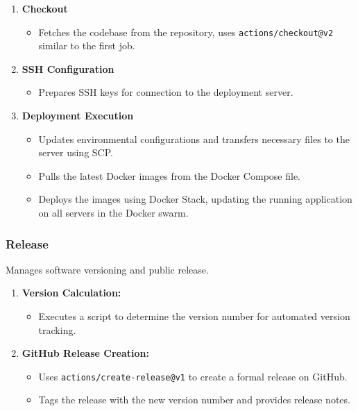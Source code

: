 \documentclass[12pt, a4paper, oneside]{book}
\begin{document}
\begin{enumerate}
    \item \textbf{Checkout} 
    \begin{itemize}
        \item Fetches the codebase from the repository, uses \texttt{actions/checkout@v2} similar to the first job.
    \end{itemize}
    \item \textbf{SSH Configuration} 
    \begin{itemize}
        \item Prepares SSH keys for connection to the deployment server.
    \end{itemize}
    
    \item \textbf{Deployment Execution}
    \begin{itemize}
        \item Updates environmental configurations and transfers necessary files to the server using SCP.
        \item Pulls the latest Docker images from the Docker Compose file.
        \item Deploys the images using Docker Stack, updating the running application on all servers in the Docker swarm.
    \end{itemize}
\end{enumerate}

 \subsubsection{Release}
 Manages software versioning and public release.

 \begin{enumerate}
    \item \textbf{Version Calculation:}
    \begin{itemize}
        \item Executes a script to determine the version number for automated version tracking.
    \end{itemize}
    
    \item \textbf{GitHub Release Creation:}
    \begin{itemize}
        \item Uses \texttt{actions/create-release@v1} to create a formal release on GitHub.
        \item Tags the release with the new version number and provides release notes.
    \end{itemize}
\end{enumerate}
\end{document}
